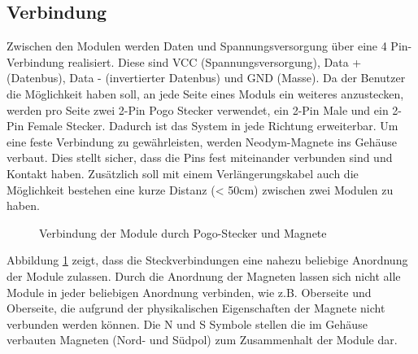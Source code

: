 \subsection{Verbindung}
Zwischen den Modulen werden Daten und Spannungsversorgung über eine 4 Pin-Verbindung realisiert. Diese sind VCC (Spannungsversorgung), Data + (Datenbus), Data - (invertierter Datenbus) und GND (Masse). Da der Benutzer die Möglichkeit haben soll, an jede Seite eines Moduls ein weiteres anzustecken, werden pro Seite zwei 2-Pin Pogo Stecker verwendet, ein 2-Pin Male und ein 2-Pin Female Stecker. Dadurch ist das System in jede Richtung erweiterbar. Um eine feste Verbindung zu gewährleisten,  werden Neodym-Magnete ins Gehäuse verbaut. Dies stellt sicher, dass die Pins fest miteinander verbunden sind und Kontakt haben. Zusätzlich soll mit einem Verlängerungskabel auch die Möglichkeit bestehen eine kurze Distanz (< 50cm) zwischen zwei Modulen zu haben. 
\begin{figure}[H]
    \centering    
    \caption{Verbindung der Module durch Pogo-Stecker und Magnete}
    \label{pogo_verbindung}
\end{figure}
 \noindent Abbildung \ref{pogo_verbindung} zeigt, dass die Steckverbindungen eine nahezu beliebige Anordnung der Module zulassen. Durch die Anordnung der Magneten lassen sich nicht alle Module in jeder beliebigen Anordnung verbinden, wie z.B. Oberseite und Oberseite, die aufgrund der physikalischen Eigenschaften der Magnete nicht verbunden werden können. Die \glqq N\grqq{} und \glqq S\grqq{} Symbole stellen die im Gehäuse verbauten Magneten (Nord- und Südpol) zum Zusammenhalt der Module dar.
 

